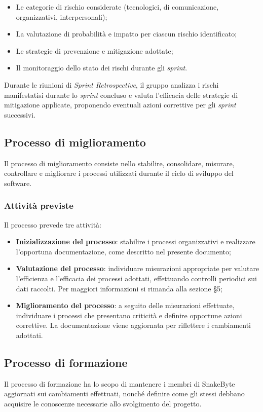 \documentclass[10pt, letterpaper]{article}
\begin{document}
\begin{itemize}
    \item Le categorie di rischio considerate (tecnologici, di comunicazione, organizzativi, interpersonali);
    \item La valutazione di probabilità e impatto per ciascun rischio identificato;
    \item Le strategie di prevenzione e mitigazione adottate;
    \item Il monitoraggio dello stato dei rischi durante gli \textit{sprint}.
\end{itemize}

Durante le riunioni di \textit{Sprint Retrospective}, il gruppo analizza i rischi manifestatisi durante lo \textit{sprint} concluso e valuta l'efficacia delle strategie di mitigazione applicate, proponendo eventuali azioni correttive per gli \textit{sprint} successivi.

\subsection{Processo di miglioramento}
Il processo di miglioramento consiste nello stabilire, consolidare, misurare, 
controllare e migliorare i processi utilizzati durante il ciclo di sviluppo 
del software.

\subsubsection{Attività previste}
Il processo prevede tre attività:
\begin{itemize}
    \item \textbf{Inizializzazione del processo}: stabilire i processi 
    organizzativi e realizzare l'opportuna documentazione, come descritto 
    nel presente documento;
    \item \textbf{Valutazione del processo}: individuare misurazioni 
    appropriate per valutare l'efficienza e l'efficacia dei processi 
    adottati, effettuando controlli periodici sui dati raccolti. 
    Per maggiori informazioni si rimanda alla sezione §5;
    \item \textbf{Miglioramento del processo}: a seguito delle misurazioni 
    effettuate, individuare i processi che presentano criticità e definire 
    opportune azioni correttive. La documentazione viene aggiornata per 
    riflettere i cambiamenti adottati.
\end{itemize}

\subsection{Processo di formazione}
Il processo di formazione ha lo scopo di mantenere i membri di SnakeByte 
aggiornati sui cambiamenti effettuati, nonché definire come gli stessi 
debbano acquisire le conoscenze necessarie allo svolgimento del progetto.
\end{document}
